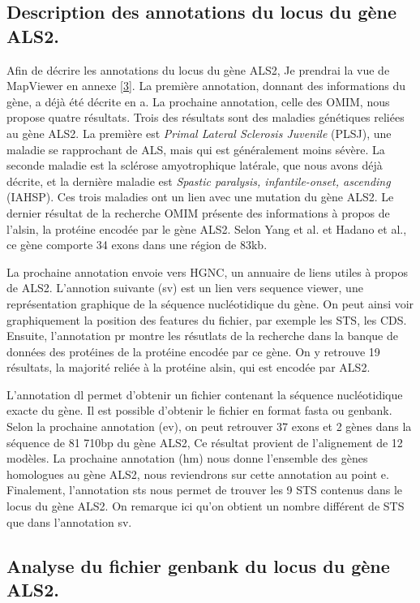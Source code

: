 \documentclass[10.8pt]{article} %
\begin{document}
\subsection[Annotations du gène ALS2]{Description des annotations du locus du gène ALS2.}

Afin de décrire les annotations du locus du gène ALS2, Je prendrai la vue de MapViewer en annexe \ref{3}. La première annotation, 
donnant des informations du gène, a déjà été décrite en a. La prochaine annotation, celle des OMIM, nous propose quatre résultats. 
Trois des résultats sont des maladies génétiques reliées au gène ALS2. La première est \emph{Primal Lateral Sclerosis Juvenile} (PLSJ),
une maladie se rapprochant de ALS, mais qui est généralement moins sévère. La seconde maladie est la sclérose amyotrophique latérale, 
que nous avons déjà décrite, et la dernière maladie est \emph{Spastic paralysis, infantile-onset, ascending} (IAHSP). 
Ces trois maladies ont un lien avec une mutation du gène ALS2. Le dernier résultat de la recherche OMIM présente des informations à
propos de l'alsin, la protéine encodée par le gène ALS2. Selon Yang et al. et Hadano et al., ce gène comporte 34 exons 
dans une région de 83kb.

La prochaine annotation envoie vers HGNC, un annuaire de liens utiles à propos de ALS2. L'annotion suivante (sv) 
est un lien vers sequence viewer, une représentation graphique de la séquence nucléotidique du gène. On peut ainsi voir graphiquement la
position des features du fichier, par exemple les STS, les CDS. Ensuite, l'annotation pr montre les résutlats de la recherche dans la
banque de données des protéines de la protéine encodée par ce gène. On y retrouve 19 résultats, la majorité reliée à la protéine alsin,
qui est encodée par ALS2. 

L'annotation dl permet d'obtenir un fichier contenant la séquence nucléotidique exacte du gène.
Il est possible d'obtenir le fichier en format fasta ou genbank. Selon la prochaine annotation (ev), on peut retrouver
37 exons et 2 gènes dans la séquence de 81 710bp du gène ALS2, Ce résultat provient de l'alignement de 12 modèles. 
La prochaine annotation (hm) nous donne l'ensemble des gènes homologues au gène ALS2, nous reviendrons sur cette annotation au point e. 
Finalement, l'annotation sts nous permet de trouver les 9 STS contenus dans le locus du gène ALS2. 
On remarque ici qu'on obtient un nombre différent de STS que dans l'annotation sv.

\subsection[Fichier genbank du gène ALS2]{Analyse du fichier genbank du locus du gène ALS2.}
\end{document}

